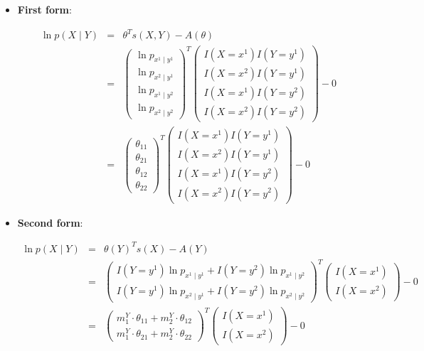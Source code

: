 \documentclass[11pt, oneside]{article}   	%
\numberwithin{figure}{section}
\numberwithin{equation}{section}
\numberwithin{table}{section}
\theoremstyle{definition}
\begin{document}
\begin{appendices}
\begin{itemize}

\item \textbf{First form}:

\begin{eqnarray*}
\ln p(X \mid Y) &=& \theta^T s(X,Y) - A(\theta) \\
&=&
\begin{pmatrix}
\ln p_{x^1 \mid y^1}\\
\ln p_{x^2 \mid y^1}\\
\ln p_{x^1 \mid y^2}\\
\ln p_{x^2 \mid y^2}
\end{pmatrix}^T
\begin{pmatrix}
I(X=x^1)I(Y=y^1) \\
I(X=x^2)I(Y=y^1) \\
I(X=x^1)I(Y=y^2) \\
I(X=x^2)I(Y=y^2) 
\end{pmatrix}
- 0\\
&=&
\begin{pmatrix}
\theta_{11}\\
\theta_{21}\\
\theta_{12}\\
\theta_{22}
\end{pmatrix}^T
\begin{pmatrix}
I(X=x^1)I(Y=y^1) \\
I(X=x^2)I(Y=y^1) \\
I(X=x^1)I(Y=y^2) \\
I(X=x^2)I(Y=y^2) 
\end{pmatrix}
- 0
\end{eqnarray*}

\item \textbf{Second form}:

\begin{eqnarray*}
\ln p(X \mid Y) &=& \theta(Y)^Ts(X) - A(Y) \\
&=&
\begin{pmatrix}
I(Y=y^1)\ln p_{x^1 \mid y^1}  + I(Y=y^2)\ln p_{x^1 \mid y^2}\\
I(Y=y^1)\ln p_{x^2 \mid y^1}  + I(Y=y^2)\ln p_{x^2 \mid y^2}
\end{pmatrix}^T
\begin{pmatrix}
I(X=x^1) \\
I(X=x^2)
\end{pmatrix}
- 0 \\
&=&
\begin{pmatrix}
m^Y_1\cdot\theta_{11}  + m^Y_2\cdot\theta_{12}\\
m^Y_1\cdot\theta_{21}  + m^Y_2\cdot\theta_{22}
\end{pmatrix}^T
\begin{pmatrix}
I(X=x^1) \\
I(X=x^2)
\end{pmatrix}
- 0 
\end{eqnarray*}


\end{itemize}
\end{appendices}
\end{document}
